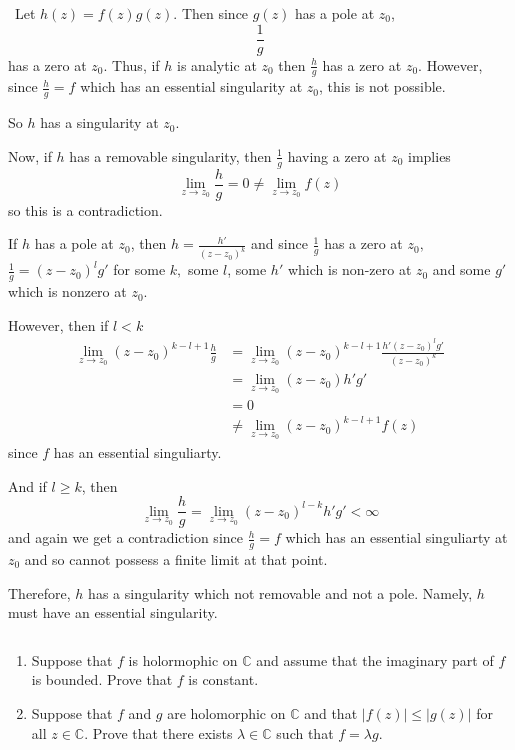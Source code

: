 \documentclass[12pt]{Homework}
\begin{document}
\begin{solution}$\,$
Let $h(z)=f(z)g(z)$. Then since $g(z)$ has a pole at $z_0$, $$\frac{1}{g}$$ has a zero at $z_0$. Thus, if $h$ is analytic at $z_0$ then $\frac{h}{g}$ has a zero at $z_0$. However, since $\frac{h}{g}=f$ which has an essential singularity at $z_0$, this is not possible.

So $h$ has a singularity at $z_0.$

Now, if $h$ has a removable singularity, then $\frac{1}{g}$ having a zero at $z_0$ implies $$\lim_{z\to z_0}\frac{h}{g}=0\not=\lim_{z\to z_0}f(z)$$ so this is a contradiction.

If $h$ has a pole at $z_0$, then $h=\frac{h'}{(z-z_0)^k}$ and since $\frac{1}{g}$ has a zero at $z_0,$ $\frac{1}{g}=(z-z_0)^lg'$ for some $k,$ some $l$, some $h'$ which is non-zero at $z_0$ and some $g'$ which is nonzero at $z_0$.

However, then if $l<k$ \begin{align*}
    \lim_{z\to z_0}(z-z_0)^{k-l+1}\frac{h}{g}&=\lim_{z\to z_0}(z-z_0)^{k-l+1}\frac{h'(z-z_0)^lg'}{(z-z_0)^k}\\
    &=\lim_{z\to z_0}(z-z_0)h'g'\\
    &=0\\
    &\not=\lim_{z\to z_0}(z-z_0)^{k-l+1}f(z)
\end{align*} since $f$ has an essential singuliarty.

And if $l\ge k$, then $$\lim_{z\to z_0}\frac{h}{g}=\lim_{z\to z_0}(z-z_0)^{l-k}h'g'<\infty$$ and again we get a contradiction since $\frac{h}{g}=f$ which has an essential singuliarty at $z_0$ and so cannot possess a finite limit at that point.

Therefore, $h$ has a singularity which not removable and not a pole. Namely, $h$ must have an essential singularity. 
\end{solution}
\newpage





\begin{problem} $\,$
\begin{enumerate}[label=(\alph*)]
    \item Suppose that $f$ is holormophic on $\mathbb{C}$ and assume that the imaginary part of $f$ is bounded. Prove that $f$ is constant.
    \item Suppose that $f$ and $g$ are holomorphic on $\mathbb{C}$ and that $|f(z)|\le|g(z)|$ for all $z\in\mathbb{C}$. Prove that there exists $\lambda\in\mathbb{C}$ such that $f=\lambda g$.
\end{enumerate}
\end{problem}
\end{document}
